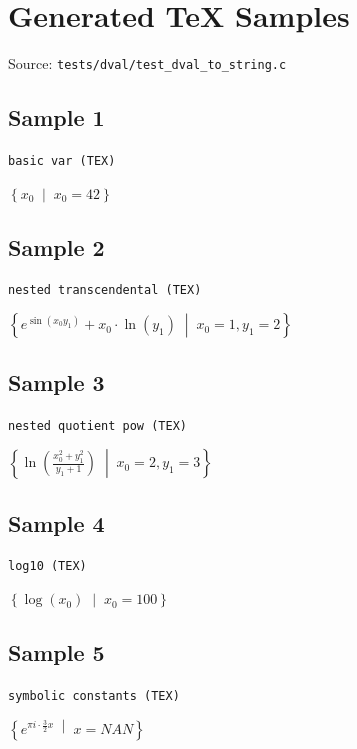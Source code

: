 \documentclass{article}
\begin{document}
\section*{Generated TeX Samples}
\noindent Source: \texttt{tests/dval/test\_dval\_to\_string.c}

\subsection*{Sample 1}
\noindent\texttt{basic var (TEX)}
\begin{flushleft}
$\displaystyle \left\{ x_{0} \;\middle|\; x_{0} = 42 \right\}$
\end{flushleft}

\subsection*{Sample 2}
\noindent\texttt{nested transcendental (TEX)}
\begin{flushleft}
$\displaystyle \left\{ e^{\sin(x_{0} y_{1})} + x_{0} \cdot \ln(y_{1}) \;\middle|\; x_{0} = 1, y_{1} = 2 \right\}$
\end{flushleft}

\subsection*{Sample 3}
\noindent\texttt{nested quotient pow (TEX)}
\begin{flushleft}
$\displaystyle \left\{ \ln(\frac{x_{0}^{2} + y_{1}^{2}}{y_{1} + 1}) \;\middle|\; x_{0} = 2, y_{1} = 3 \right\}$
\end{flushleft}

\subsection*{Sample 4}
\noindent\texttt{log10 (TEX)}
\begin{flushleft}
$\displaystyle \left\{ \log(x_{0}) \;\middle|\; x_{0} = 100 \right\}$
\end{flushleft}

\subsection*{Sample 5}
\noindent\texttt{symbolic constants (TEX)}
\begin{flushleft}
$\displaystyle \left\{ e^{\pi i \cdot \frac{3}{2} x} \;\middle|\; x = NAN \right\}$
\end{flushleft}
\end{document}
